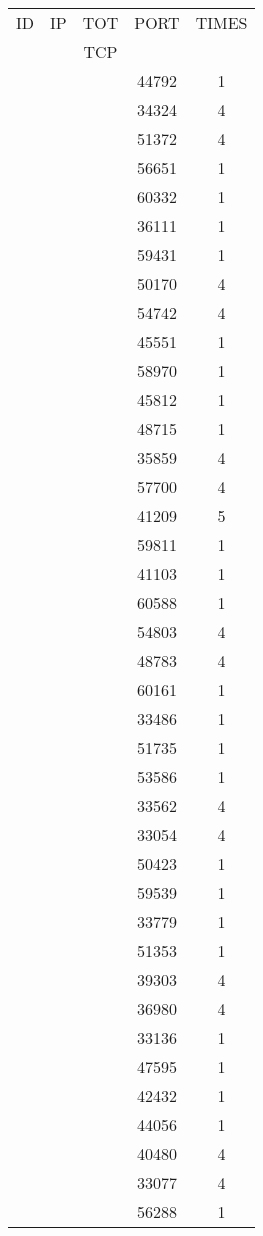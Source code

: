 \documentclass[a4paper]{scrartcl}
\begin{document}
\begin{minipage}[b]{0.5\linewidth}
\begin{tabular}{| c | c | c | c | c |}
\hline
ID & IP & TOT & PORT & TIMES \\ 
   &    & TCP &      &       \\ 
\hline
& & & 44792 & 1 \\ & & & 34324 & 4 \\ & & & 51372 & 4 \\ & & & 56651 & 1 \\ & & & 60332 & 1 \\ & & & 36111 & 1 \\ & & & 59431 & 1 \\ & & & 50170 & 4 \\ & & & 54742 & 4 \\ & & & 45551 & 1 \\ & & & 58970 & 1 \\ & & & 45812 & 1 \\ & & & 48715 & 1 \\ & & & 35859 & 4 \\ & & & 57700 & 4 \\ & & & 41209 & 5 \\ & & & 59811 & 1 \\ & & & 41103 & 1 \\ & & & 60588 & 1 \\ & & & 54803 & 4 \\ & & & 48783 & 4 \\ & & & 60161 & 1 \\ & & & 33486 & 1 \\ & & & 51735 & 1 \\ & & & 53586 & 1 \\ & & & 33562 & 4 \\ & & & 33054 & 4 \\ & & & 50423 & 1 \\ & & & 59539 & 1 \\ & & & 33779 & 1 \\ & & & 51353 & 1 \\ & & & 39303 & 4 \\ & & & 36980 & 4 \\ & & & 33136 & 1 \\ & & & 47595 & 1 \\ & & & 42432 & 1 \\ & & & 44056 & 1 \\ & & & 40480 & 4 \\ & & & 33077 & 4 \\ & & & 56288 & 1 \\ \hline\end{tabular}\end{minipage} \hfill\begin{minipage}[b]{0.5\linewidth}\begin{tabular}{| c | c | c | c | c |}

\end{tabular}
\end{minipage}
\end{document}
